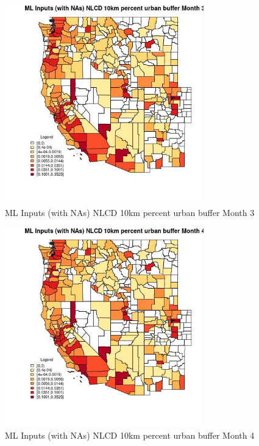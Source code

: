 \begin{figure} 
\centering  
\includegraphics[width=0.77\textwidth]{Code_Outputs/Report_ML_input_PM25_Step4_part_e_de_duplicated_aves_compiled_2019-05-21wNAs_CountyNLCD_10km_percent_urban_buffermedianMonth3.jpg} 
\caption{\label{fig:Report_ML_input_PM25_Step4_part_e_de_duplicated_aves_compiled_2019-05-21wNAsCountyNLCD_10km_percent_urban_buffermedianMonth3}ML Inputs (with NAs) NLCD 10km percent urban buffer Month 3} 
\end{figure} 
 

\begin{figure} 
\centering  
\includegraphics[width=0.77\textwidth]{Code_Outputs/Report_ML_input_PM25_Step4_part_e_de_duplicated_aves_compiled_2019-05-21wNAs_CountyNLCD_10km_percent_urban_buffermedianMonth4.jpg} 
\caption{\label{fig:Report_ML_input_PM25_Step4_part_e_de_duplicated_aves_compiled_2019-05-21wNAsCountyNLCD_10km_percent_urban_buffermedianMonth4}ML Inputs (with NAs) NLCD 10km percent urban buffer Month 4} 
\end{figure} 
 

